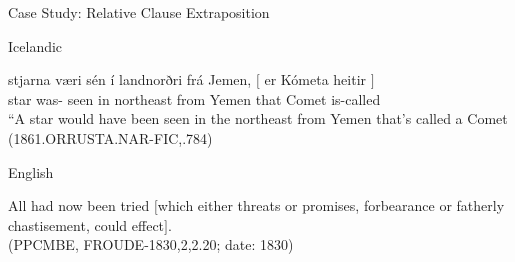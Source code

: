 \documentclass[hyperref={pdfpagelabels=false}]{beamer}
\begin{document}
\begin{frame}{Case Study: Relative Clause Extraposition}

	
\begin{block}{Icelandic}
		\begin{exe}
			\ex \gll stjarna væri sén í landnorðri frá Jemen, $[$ er Kómeta heitir $]$\\
			star was- seen in northeast from Yemen that Comet is-called\\
			\quad ``A star would have been seen in the northeast from Yemen that's called a Comet\\
			(1861.ORRUSTA.NAR-FIC,.784)\\
		\end{exe}
	\end{block} 

	\begin{block}{English}
		\begin{exe}
			\ex All had now been tried $[$which either threats or promises, forbearance or
fatherly chastisement, could effect$]$.\\
			(PPCMBE, FROUDE-1830,2,2.20; date: 1830)
		\end{exe}
	\end{block}



\end{frame}




\end{document}
